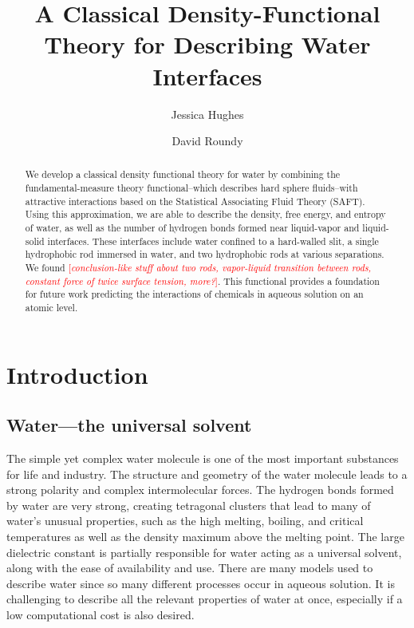 \documentclass[letterpaper,twocolumn,amsmath,amssymb,prb]{revtex4-1}
\newcommand{\needsworknow}[1]{\textcolor{red}{[\emph{#1}]}}
\begin{document}
\title{A Classical Density-Functional Theory for Describing Water Interfaces}

\author{Jessica Hughes}

\author{David Roundy}

\begin{abstract}
{We develop a classical density functional theory for water by combining the fundamental-measure theory functional--which describes hard sphere fluids--with attractive interactions based on the Statistical Associating Fluid Theory (SAFT). Using this approximation, we are able to describe the density, free energy, and
entropy of water, as well as the number of hydrogen bonds formed near liquid-vapor and liquid-solid interfaces. These interfaces include water confined to a hard-walled slit, a single hydrophobic rod immersed in water, and two hydrophobic rods 
at various separations. We found \needsworknow{conclusion-like stuff about two rods, vapor-liquid transition between rods, constant force of twice surface tension, more?}.
This functional provides a foundation for future work predicting the interactions of chemicals in aqueous solution on an
atomic level.}

\end{abstract}

\maketitle

\section{Introduction}

\subsection{Water---the universal solvent}

The simple yet complex water molecule is one of the most important 
substances for life and industry. The structure and geometry of the 
water molecule leads to a strong polarity and complex intermolecular
forces. The hydrogen bonds formed by water are very strong, creating
tetragonal clusters that lead to many of water's unusual properties,
such as the high melting, boiling, and critical temperatures as well as the
density maximum above the melting point.
The large dielectric constant is partially responsible for
water acting as a universal solvent, along with the ease of availability and
use.
There are many models used to describe water since so many different
processes occur in aqueous solution. It is challenging to describe all the 
relevant properties of water at once, especially if a low computational cost is
also desired.
\end{document}
